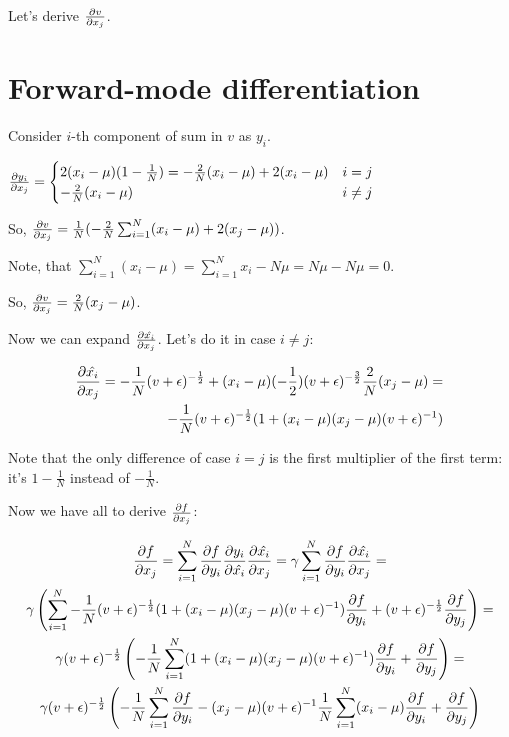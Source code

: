 \documentclass[12pt]{article}
\begin{document}
Let's derive $\pdv{v}{x_j}$.

\section{Forward-mode differentiation}

Consider $i$-th component of sum in $v$ as $y_i$.

$
\pdv{y_i}{x_j} = 
\begin{cases}
2 (x_i - \mu) (1 - \frac{1}{N}) = -\frac{2}{N} (x_i - \mu) + 2(x_i - \mu) & \text{$i = j$} \\
-\frac{2}{N} (x_i - \mu) & \text{$i \ne j$}
\end{cases}
$ 

So, $\pdv{v}{x_j} = \frac{1}{N} ( -\frac{2}{N} \sum_{i=1}^{N}(x_i - \mu) + 2(x_j - \mu))$.

Note, that $\sum_{i=1}^{N}(x_i - \mu) = \sum_{i=1}^{N} x_i - N \mu = N \mu - N \mu = 0$.

So, $\pdv{v}{x_j} = \frac{2}{N} (x_j - \mu)$.

Now we can expand $\pdv{\hat{x_i}}{x_j}$. Let's do it in case $i \ne j$:

\begin{gather*}
\begin{split}
\pdv{\hat{x_i}}{x_j} =
-\frac{1}{N} (v + \epsilon)^{-\frac{1}{2}} + (x_i - \mu) (-\frac{1}{2}) (v + \epsilon)^{-\frac{3}{2}} \frac{2}{N}(x_j - \mu) = \\
-\frac{1}{N} (v + \epsilon)^{-\frac{1}{2}} (1 + (x_i - \mu) (x_j - \mu) (v + \epsilon)^{-1})
\end{split}
\end{gather*}

Note that the only difference of case $i = j$ is the first multiplier of the first term: it's $1 - \frac{1}{N}$ instead of $-\frac{1}{N}$.

Now we have all to derive $\pdv{f}{x_j}$:

\begin{gather*}
\pdv{f}{x_j} = 
\sum_{i=1}^{N} \pdv{f}{y_i} \pdv{y_i}{\hat{x_i}} \pdv{\hat{x_i}}{x_j} = 
\gamma \sum_{i=1}^{N} \pdv{f}{y_i} \pdv{\hat{x_i}}{x_j} = \\
\gamma \left( \sum_{i=1}^{N} -\frac{1}{N} (v + \epsilon)^{-\frac{1}{2}} (1 + (x_i - \mu) (x_j - \mu) (v + \epsilon)^{-1}) \pdv{f}{y_i} + (v + \epsilon)^{-\frac{1}{2}} \pdv{f}{y_j} \right) = \\
\gamma (v + \epsilon)^{-\frac{1}{2}} \left( -\frac{1}{N} \sum_{i=1}^{N} (1 + (x_i - \mu) (x_j - \mu) (v + \epsilon)^{-1}) \pdv{f}{y_i} + \pdv{f}{y_j} \right) = \\
\gamma (v + \epsilon)^{-\frac{1}{2}} \left( -\frac{1}{N} \sum_{i=1}^{N} \pdv{f}{y_i} - (x_j - \mu) (v + \epsilon)^{-1} \frac{1}{N} \sum_{i=1}^{N} (x_i - \mu) \pdv{f}{y_i} + \pdv{f}{y_j} \right)
\end{gather*}
\end{document}
